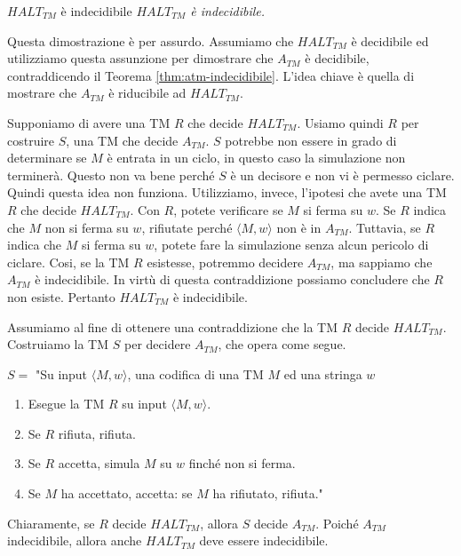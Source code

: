 \begin{Thm}{$HALT_{TM}$ è indecidibile}{}
\textit{$HALT_{TM}$ è indecidibile.}

\begin{osservation}
Questa dimostrazione è per assurdo. Assumiamo che $HALT_{TM}$ è decidibile ed utilizziamo questa assunzione per dimostrare che $A_{TM}$ è decidibile, contraddicendo il Teorema \ref{thm:atm-indecidibile}. L'idea chiave è quella di mostrare che $A_{TM}$ è riducibile ad $HALT_{TM}$.

Supponiamo di avere una TM $R$ che decide $HALT_{TM}$. Usiamo quindi $R$ per costruire $S$, una TM che decide $A_{TM}$. $S$ potrebbe non essere in grado di determinare se $M$ è entrata in un ciclo, in questo caso la simulazione non terminerà. Questo non va bene perché $S$ è un decisore e non vi è permesso ciclare. Quindi questa idea non funziona. Utilizziamo, invece, l'ipotesi che avete una TM $R$ che decide $HALT_{TM}$. Con $R$, potete verificare se $M$ si ferma su $w$. Se $R$ indica che $M$ non si ferma su $w$, rifiutate perché $\langle M,w\rangle$ non è in $A_{TM}$. Tuttavia, se $R$ indica che $M$ si ferma su $w$, potete fare la simulazione senza alcun pericolo di ciclare. Cosi, se la TM $R$ esistesse, potremmo decidere $A_{TM}$, ma sappiamo che $A_{TM}$ è indecidibile. In virtù di questa contraddizione possiamo concludere che $R$ non esiste. Pertanto $HALT_{TM}$ è indecidibile.

\begin{demonstration}
Assumiamo al fine di ottenere una contraddizione che la TM $R$ decide $HALT_{TM}$. Costruiamo la TM $S$ per decidere $A_{TM}$, che opera come segue.

$S=$ "Su input $\langle M,w\rangle$, una codifica di una TM $M$ ed una stringa $w$
\begin{enumerate}
    \item Esegue la TM $R$ su input $\langle M,w\rangle$.
    \item Se $R$ rifiuta, rifiuta.
    \item Se $R$ accetta, simula $M$ su $w$ finché non si ferma.
    \item Se $M$ ha accettato, accetta: se $M$ ha rifiutato, rifiuta."
\end{enumerate}

Chiaramente, se $R$ decide $HALT_{TM}$, allora $S$ decide $A_{TM}$. Poiché $A_{TM}$ indecidibile, allora anche $HALT_{TM}$ deve essere indecidibile.
\end{demonstration}
\end{osservation}
\end{Thm}

